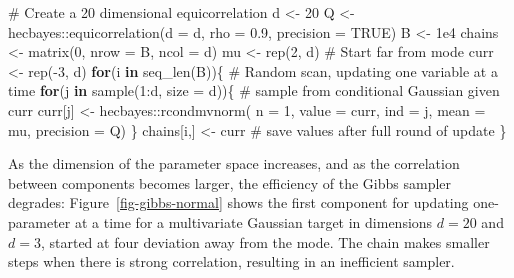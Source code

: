 \documentclass[
  11pt,
  letterpaper,
]{scrbook}
\newenvironment{Shaded}{\begin{snugshade}}{\end{snugshade}}
\newcommand{\AttributeTok}[1]{\textcolor[rgb]{0.40,0.45,0.13}{#1}}
\newcommand{\CommentTok}[1]{\textcolor[rgb]{0.37,0.37,0.37}{#1}}
\newcommand{\ConstantTok}[1]{\textcolor[rgb]{0.56,0.35,0.01}{#1}}
\newcommand{\ControlFlowTok}[1]{\textcolor[rgb]{0.00,0.23,0.31}{\textbf{#1}}}
\newcommand{\DecValTok}[1]{\textcolor[rgb]{0.68,0.00,0.00}{#1}}
\newcommand{\FloatTok}[1]{\textcolor[rgb]{0.68,0.00,0.00}{#1}}
\newcommand{\FunctionTok}[1]{\textcolor[rgb]{0.28,0.35,0.67}{#1}}
\newcommand{\NormalTok}[1]{\textcolor[rgb]{0.00,0.23,0.31}{#1}}
\newcommand{\OtherTok}[1]{\textcolor[rgb]{0.00,0.23,0.31}{#1}}
\newcommand{\SpecialCharTok}[1]{\textcolor[rgb]{0.37,0.37,0.37}{#1}}
\theoremstyle{definition}
\theoremstyle{plain}
\theoremstyle{plain}
\theoremstyle{definition}
\theoremstyle{definition}
\theoremstyle{remark}
\begin{document}
\begin{Shaded}
\begin{Highlighting}[]
\CommentTok{\# Create a 20 dimensional equicorrelation}
\NormalTok{d }\OtherTok{\textless{}{-}} \DecValTok{20}
\NormalTok{Q }\OtherTok{\textless{}{-}}\NormalTok{ hecbayes}\SpecialCharTok{::}\FunctionTok{equicorrelation}\NormalTok{(}\AttributeTok{d =}\NormalTok{ d, }\AttributeTok{rho =} \FloatTok{0.9}\NormalTok{, }\AttributeTok{precision =} \ConstantTok{TRUE}\NormalTok{)}
\NormalTok{B }\OtherTok{\textless{}{-}} \FloatTok{1e4}
\NormalTok{chains }\OtherTok{\textless{}{-}} \FunctionTok{matrix}\NormalTok{(}\DecValTok{0}\NormalTok{, }\AttributeTok{nrow =}\NormalTok{ B, }\AttributeTok{ncol =}\NormalTok{ d)}
\NormalTok{mu }\OtherTok{\textless{}{-}} \FunctionTok{rep}\NormalTok{(}\DecValTok{2}\NormalTok{, d)}
\CommentTok{\# Start far from mode}
\NormalTok{curr }\OtherTok{\textless{}{-}} \FunctionTok{rep}\NormalTok{(}\SpecialCharTok{{-}}\DecValTok{3}\NormalTok{, d)}
\ControlFlowTok{for}\NormalTok{(i }\ControlFlowTok{in} \FunctionTok{seq\_len}\NormalTok{(B))\{}
  \CommentTok{\# Random scan, updating one variable at a time}
  \ControlFlowTok{for}\NormalTok{(j }\ControlFlowTok{in} \FunctionTok{sample}\NormalTok{(}\DecValTok{1}\SpecialCharTok{:}\NormalTok{d, }\AttributeTok{size =}\NormalTok{ d))\{}
    \CommentTok{\# sample from conditional Gaussian given curr}
\NormalTok{    curr[j] }\OtherTok{\textless{}{-}}\NormalTok{ hecbayes}\SpecialCharTok{::}\FunctionTok{rcondmvnorm}\NormalTok{(}
      \AttributeTok{n =} \DecValTok{1}\NormalTok{,}
      \AttributeTok{value =}\NormalTok{ curr,}
      \AttributeTok{ind =}\NormalTok{ j,}
      \AttributeTok{mean =}\NormalTok{ mu,}
      \AttributeTok{precision =}\NormalTok{ Q)}
\NormalTok{  \}}
\NormalTok{  chains[i,] }\OtherTok{\textless{}{-}}\NormalTok{ curr }\CommentTok{\# save values after full round of update}
\NormalTok{\}}
\end{Highlighting}
\end{Shaded}

As the dimension of the parameter space increases, and as the
correlation between components becomes larger, the efficiency of the
Gibbs sampler degrades: Figure~\ref{fig-gibbs-normal} shows the first
component for updating one-parameter at a time for a multivariate
Gaussian target in dimensions \(d=20\) and \(d=3\), started at four
deviation away from the mode. The chain makes smaller steps when there
is strong correlation, resulting in an inefficient sampler.
\end{document}
